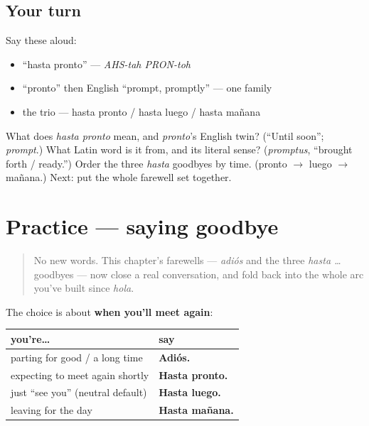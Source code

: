\subsection*{Your turn}
Say these aloud:

\begin{itemize}
\raggedright
  \item \textquotedblleft{}hasta pronto\textquotedblright{} — \emph{AHS-tah PRON-toh}
  \item \textquotedblleft{}pronto\textquotedblright{} then English \textquotedblleft{}prompt, promptly\textquotedblright{} — one family
  \item the trio — hasta pronto / hasta luego / hasta mañana
\end{itemize}

\begin{tcolorbox}[breakable,colback=teal!4,colframe=teal!35!black,title={Before you move on}]
What does \emph{hasta pronto} mean, and \emph{pronto}'s English twin? (\textquotedblleft{}Until soon\textquotedblright{}; \emph{prompt}.) What Latin word is it from, and its literal sense? (\emph{promptus}, \textquotedblleft{}brought forth / ready.\textquotedblright{}) Order the three \emph{hasta} goodbyes by time. (pronto $\to$ luego $\to$ mañana.) Next: put the whole farewell set together.
\end{tcolorbox}
\section[Practice]{Practice — saying goodbye}

\label{lesson:ES-C05-practice}



\begin{quote}
No new words. This chapter's farewells — \emph{adiós} and the three \emph{hasta …} goodbyes — now close a real conversation, and fold back into the whole arc you've built since \emph{hola}.
\end{quote}

\begin{grammarlens}[title={Grammar Lens: choosing the right goodbye}]
The choice is about \textbf{when you'll meet again}:

\noindent
\begin{tabularx}{\linewidth}{@{}>{\raggedright\arraybackslash}X>{\raggedright\arraybackslash}X@{}}
\toprule
\textbf{you're…} & \textbf{say} \\
\midrule
parting for good / a long time & \textbf{Adiós.} \\
expecting to meet again shortly & \textbf{Hasta pronto.} \\
just \textquotedblleft{}see you\textquotedblright{} (neutral default) & \textbf{Hasta luego.} \\
leaving for the day & \textbf{Hasta mañana.} \\
\bottomrule
\end{tabularx}
\end{grammarlens}

